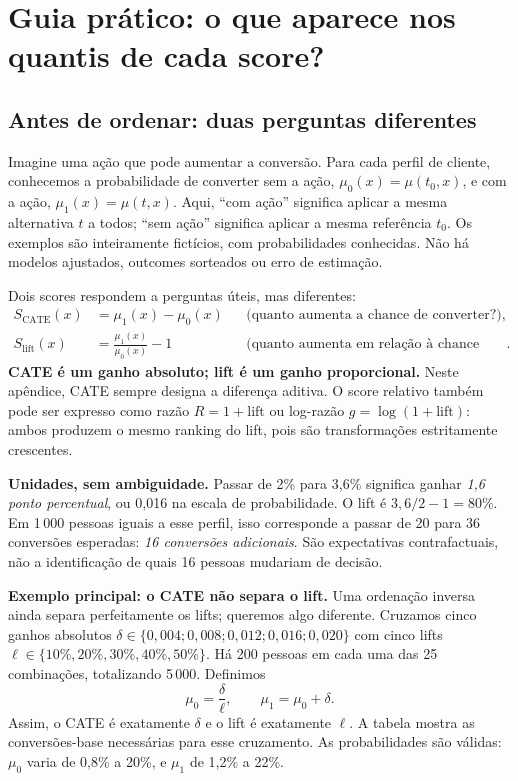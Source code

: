 \clearpage
\section{Guia prático: o que aparece nos quantis de cada score?}
\label{app:quantiles}

\subsection{Antes de ordenar: duas perguntas diferentes}
Imagine uma ação que pode aumentar a conversão. Para cada perfil de cliente, conhecemos a probabilidade de converter sem a ação, $\mu_0(x)=\mu(t_0,x)$, e com a ação, $\mu_1(x)=\mu(t,x)$. Aqui, ``com ação'' significa aplicar a mesma alternativa $t$ a todos; ``sem ação'' significa aplicar a mesma referência $t_0$. Os exemplos são inteiramente fictícios, com probabilidades conhecidas. Não há modelos ajustados, outcomes sorteados ou erro de estimação.

Dois scores respondem a perguntas úteis, mas diferentes:
\begin{align*}
S_{\mathrm{CATE}}(x)&=\mu_1(x)-\mu_0(x)
&&\text{(quanto aumenta a chance de converter?)},\\
S_{\mathrm{lift}}(x)&=\frac{\mu_1(x)}{\mu_0(x)}-1
&&\text{(quanto aumenta em relação à chance inicial?)}.
\end{align*}
\textbf{CATE é um ganho absoluto; lift é um ganho proporcional.} Neste apêndice, CATE sempre designa a diferença aditiva. O score relativo também pode ser expresso como razão $R=1+\mathrm{lift}$ ou log-razão $g=\log(1+\mathrm{lift})$: ambos produzem o mesmo ranking do lift, pois são transformações estritamente crescentes.

\noindent\textbf{Unidades, sem ambiguidade.} Passar de 2\% para 3,6\% significa ganhar \emph{1,6 ponto percentual}, ou 0,016 na escala de probabilidade. O lift é $3{,}6/2-1=80\%$. Em 1\,000 pessoas iguais a esse perfil, isso corresponde a passar de 20 para 36 conversões esperadas: \emph{16 conversões adicionais}. São expectativas contrafactuais, não a identificação de quais 16 pessoas mudariam de decisão.

\textbf{Exemplo principal: o CATE não separa o lift.} Uma ordenação inversa ainda separa perfeitamente os lifts; queremos algo diferente. Cruzamos cinco ganhos absolutos $\delta\in\{0{,}004;0{,}008;0{,}012;0{,}016;0{,}020\}$ com cinco lifts $\ell\in\{10\%,20\%,30\%,40\%,50\%\}$. Há 200 pessoas em cada uma das 25 combinações, totalizando 5\,000. Definimos
\[
\mu_0=\frac{\delta}{\ell},\qquad \mu_1=\mu_0+\delta.
\]
Assim, o CATE é exatamente $\delta$ e o lift é exatamente $\ell$. A tabela mostra as conversões-base necessárias para esse cruzamento. As probabilidades são válidas: $\mu_0$ varia de 0,8\% a 20\%, e $\mu_1$ de 1,2\% a 22\%.

